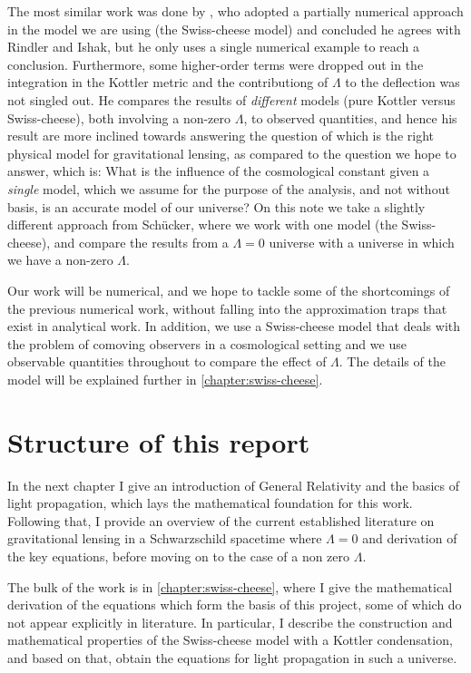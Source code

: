 The most similar work was done by \citet{schucker2009strong}, who adopted a partially numerical approach in the model we are using (the Swiss-cheese model) and concluded he agrees with Rindler and Ishak, but he only uses a single numerical example to reach a conclusion. Furthermore, some higher-order terms were dropped out in the integration in the Kottler metric and the contributiong of $\Lambda$ to the deflection was not singled out. He compares the results of \emph{different} models (pure Kottler versus Swiss-cheese), both involving a non-zero $\Lambda$, to observed quantities, and hence his result are more inclined towards answering the question of which is the right physical model for gravitational lensing, as compared to the question we hope to answer, which is: What is the influence of the cosmological constant given a \emph{single} model, which we assume for the purpose of the analysis, and not without basis, is an accurate model of our universe? On this note we take a slightly different approach from Sch{\"u}cker, where we work with one model (the Swiss-cheese), and compare the results from a $\Lambda = 0$ universe with a universe in which we have a non-zero $\Lambda$. 

Our work will be numerical, and we hope to tackle some of the shortcomings of the previous numerical work, without falling into the approximation traps that exist in analytical work. In addition, we use a Swiss-cheese model that deals with the problem of comoving observers in a cosmological setting and we use observable quantities throughout to compare the effect of $\Lambda$. The details of the model will be explained further in \autoref{chapter:swiss-cheese}.

\section{Structure of this report}
In the next chapter I give an introduction of General Relativity and the basics of light propagation, which lays the mathematical foundation for this work. Following that, I provide an overview of the current established literature on gravitational lensing in a Schwarzschild spacetime where $\Lambda = 0$ and derivation of the key equations, before moving on to the case of a non zero $\Lambda$. 

The bulk of the work is in \autoref{chapter:swiss-cheese}, where I give the mathematical derivation of the equations which form the basis of this project, some of which do not appear explicitly in literature. In particular, I describe the construction and mathematical properties of the Swiss-cheese model with a Kottler condensation, and based on that, obtain the equations for light propagation in such a universe. 

